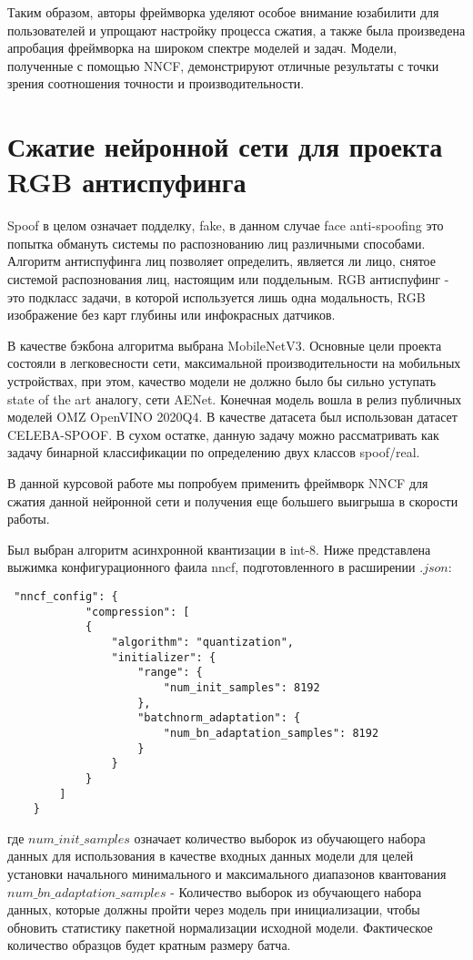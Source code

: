 \documentclass[oneside,final,12pt]{extreport}
\begin{document}
Таким образом, авторы фреймворка уделяют особое внимание юзабилити для пользователей и упрощают настройку процесса сжатия, а также была произведена апробация фреймворка на широком спектре моделей и задач. Модели, полученные с помощью NNCF, демонстрируют отличные результаты с точки зрения соотношения точности и производительности. 

\chapter{Сжатие нейронной сети для проекта RGB антиспуфинга}
Spoof в целом означает подделку, fake, в данном случае face anti-spoofing это попытка обмануть системы по распознованию лиц различными способами. Алгоритм антиспуфинга лиц позволяет определить, является ли лицо, снятое системой распознования лиц, настоящим или поддельным. RGB антиспуфинг - это подкласс задачи, в которой используется лишь одна модальность, RGB изображение без карт глубины или инфокрасных датчиков.

В качестве бэкбона алгоритма выбрана MobileNetV3. Основные цели проекта состояли в легковесности сети, максимальной производительности на мобильных устройствах, при этом, качество модели не должно было бы сильно уступать state of the art аналогу, сети AENet. Конечная модель вошла в релиз публичных моделей OMZ OpenVINO 2020Q4. В качестве датасета был использован датасет CELEBA-SPOOF. В сухом остатке, данную задачу можно рассматривать как задачу бинарной классификации по определению двух классов spoof/real. 

В данной курсовой работе мы попробуем применить фреймворк NNCF для сжатия данной нейронной сети и получения еще большего выигрыша в скорости работы. 

Был выбран алгоритм асинхронной квантизации в int-8. Ниже представлена выжимка конфигурационного фаила nncf, подготовленного в расширении $.json$:

\begin{lstlisting}
 "nncf_config": {
            "compression": [
            {
                "algorithm": "quantization",
                "initializer": {
                    "range": {
                        "num_init_samples": 8192
                    },
                    "batchnorm_adaptation": {
                        "num_bn_adaptation_samples": 8192
                    }
                }
            }
        ]
    }
\end{lstlisting}

где $num\_init\_samples$ означает количество выборок из обучающего набора данных для использования в качестве входных данных модели для целей установки начального минимального и максимального диапазонов квантования \\
$num\_bn\_adaptation\_samples$ - Количество выборок из обучающего набора данных, которые должны пройти через модель при инициализации, чтобы обновить статистику пакетной нормализации исходной модели. Фактическое количество образцов будет кратным размеру батча.
\end{document}
